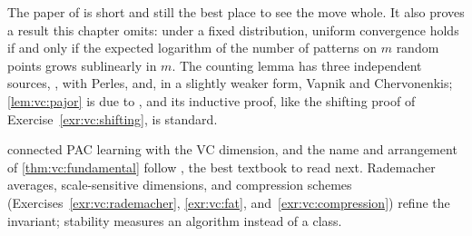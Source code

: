 \begin{refsection}[chapters/11-vc.bib]
\notesandrefs
The paper of \textcite{VapnikChervonenkis1971} is short and still the best place to see the move whole. It also proves a result this chapter omits: under a fixed distribution, uniform convergence holds if and only if the expected logarithm of the number of patterns on $m$ random points grows sublinearly in $m$. The counting lemma has three independent sources, \textcite{Sauer1972}, \textcite{Shelah1972} with Perles, and, in a slightly weaker form, Vapnik and Chervonenkis; \cref{lem:vc:pajor} is due to \textcite{Pajor1985}, and its inductive proof, like the shifting proof of Exercise~\ref{exr:vc:shifting}, is standard.

\textcite{BlumerEtAl1989} connected PAC learning with the VC dimension, and the name and arrangement of \cref{thm:vc:fundamental} follow \textcite{ShalevShwartzBenDavid2014}, the best textbook to read next. Rademacher averages, scale-sensitive dimensions, and compression schemes (Exercises~\ref{exr:vc:rademacher}, \ref{exr:vc:fat}, and~\ref{exr:vc:compression}) refine the invariant; stability measures an algorithm instead of a class.

\printchapterbib
\end{refsection}
